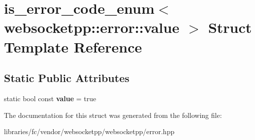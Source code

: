 \hypertarget{structis__error__code__enum_3_01websocketpp_1_1error_1_1value_01_4}{}\section{is\+\_\+error\+\_\+code\+\_\+enum$<$ websocketpp\+:\+:error\+:\+:value $>$ Struct Template Reference}
\label{structis__error__code__enum_3_01websocketpp_1_1error_1_1value_01_4}
\subsection*{Static Public Attributes}
\begin{DoxyCompactItemize}
\item 
\mbox{\label{structis__error__code__enum_3_01websocketpp_1_1error_1_1value_01_4_afe39d82e019d6303d21a6438f11fc453}} 
static bool const {\bfseries value} = true
\end{DoxyCompactItemize}


The documentation for this struct was generated from the following file\+:\begin{DoxyCompactItemize}
\item 
libraries/fc/vendor/websocketpp/websocketpp/error.\+hpp\end{DoxyCompactItemize}
